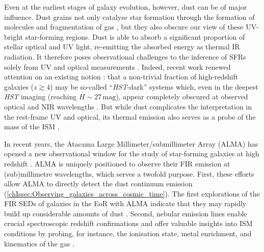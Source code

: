 Even at the earliest stages of galaxy evolution, however, dust can be of major influence. Dust grains not only catalyse star formation through the formation of molecules \citep{2018MNRAS.474.1545C} and fragmentation of gas \citep{2006MNRAS.369.1437S}, but they also obscure our view of these UV-bright star-forming regions. Dust is able to absorb a significant proportion of stellar optical and UV light, re-emitting the absorbed energy as thermal IR radiation. It therefore poses observational challenges to the inference of SFRs solely from UV and optical measurements \citep{2012ARA&A..50..531K, 2014ARA&A..52..415M, 2020ApJ...902..112B}. Indeed, recent work renewed attention on an existing notion \citep{2020RSOS....700556H}: that a non-trivial fraction of high-redshift galaxies ($z \gtrsim 4$) may be so-called ``\textit{HST}-dark'' systems which, even in the deepest \textit{HST} imaging (reaching $H \sim 27 \, \mathrm{mag}$), appear completely obscured at observed optical and NIR wavelengths \citep{2018A&A...620A.152F, 2019ApJ...884..154W, 2019Natur.572..211W, 2021Natur.597..489F, 2021ApJ...923..215C, 2022ApJ...925...23M}. But while dust complicates the interpretation in the rest-frame UV and optical, its thermal emission also serves as a probe of the mass of the ISM \citep[e.g.][]{2017ApJ...837..150S}.

In recent years, the Atacama Large Millimeter/submillimeter Array (ALMA) has opened a new observational window for the study of star-forming galaxies at high redshift \citep[see][ for a review]{2020RSOS....700556H}. ALMA is uniquely positioned to observe their FIR emission at (sub)millimetre wavelengths, which serves a twofold purpose. First, these efforts allow ALMA to directly detect the dust continuum emission (\cref{chIssec:Observing_galaxies_across_cosmic_time}). The first explorations of the FIR SEDs of galaxies in the EoR with ALMA indicate that they may rapidly build up considerable amounts of dust \citep[e.g.][]{2015Natur.519..327W, 2017ApJ...837L..21L}. Second, nebular emission lines enable crucial spectroscopic redshift confirmations and offer valuable insights into ISM conditions by probing, for instance, the ionisation state, metal enrichment, and kinematics of the gas \citep[\cref{chIssec:Nebular_emission_and_emission-line_diagnostics}; see][ for a review]{2019ARA&A..57..511K}.

